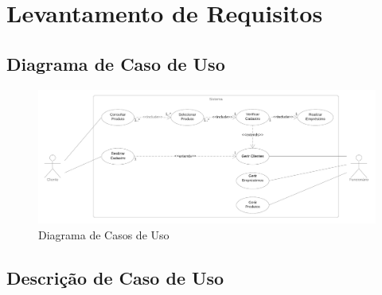 \documentclass[a4paper, 12pt]{article}
\begin{document}
\section{Levantamento de Requisitos}

\subsection{Diagrama de Caso de Uso}

\begin{figure}[ht!]
\includegraphics[width=\textwidth]{./img/casos-de-uso.png}
\centering
\caption{Diagrama de Casos de Uso}\label{img:casos-de-uso}
\end{figure}

\subsection{Descrição de Caso de Uso}
\end{document}
